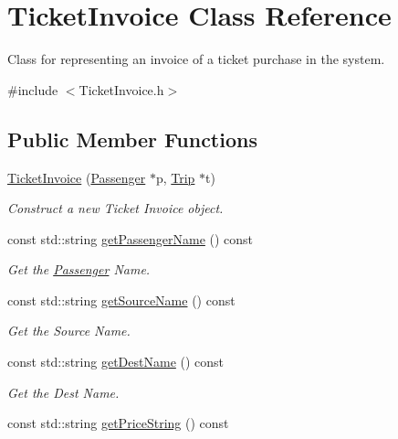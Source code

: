 \hypertarget{classTicketInvoice}{}\section{Ticket\+Invoice Class Reference}
\label{classTicketInvoice}


Class for representing an invoice of a ticket purchase in the system.  




{\ttfamily \#include $<$Ticket\+Invoice.\+h$>$}

\subsection*{Public Member Functions}
\begin{DoxyCompactItemize}
\item 
\mbox{\hyperlink{classTicketInvoice_a38b37e5168ce71bbf37aceef8a6f6267}{Ticket\+Invoice}} (\mbox{\hyperlink{classPassenger}{Passenger}} $\ast$p, \mbox{\hyperlink{classTrip}{Trip}} $\ast$t)
\begin{DoxyCompactList}\small\item\em Construct a new Ticket Invoice object. \end{DoxyCompactList}\item 
const std\+::string \mbox{\hyperlink{classTicketInvoice_a9fdfdcd08ff90480ca85e027f57033e4}{get\+Passenger\+Name}} () const
\begin{DoxyCompactList}\small\item\em Get the \mbox{\hyperlink{classPassenger}{Passenger}} Name. \end{DoxyCompactList}\item 
const std\+::string \mbox{\hyperlink{classTicketInvoice_ad692197170d5cb11790dff71150ef891}{get\+Source\+Name}} () const
\begin{DoxyCompactList}\small\item\em Get the Source Name. \end{DoxyCompactList}\item 
const std\+::string \mbox{\hyperlink{classTicketInvoice_a1db4ffac81e11b765c6204278a3df8ff}{get\+Dest\+Name}} () const
\begin{DoxyCompactList}\small\item\em Get the Dest Name. \end{DoxyCompactList}\item 
const std\+::string \mbox{\hyperlink{classTicketInvoice_a97998091765f01ff9f394210530a89ed}{get\+Price\+String}} () const

\end{DoxyCompactItemize}

